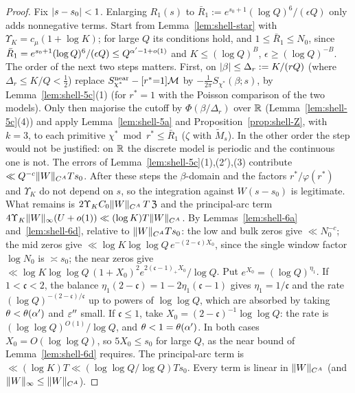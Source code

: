 \begin{proof}
Fix $\lvert s-s_0\rvert<1$. Enlarging $R_1(s)$ to $\bar R_1:=e^{s_0+1}(\log Q)^6/(\epsilon Q)$ only adds nonnegative terms. Start from Lemma~\ref{lem:shell-star} with
$\Upsilon_K=c_\mu(1+\log K)$; for large $Q$ its conditions hold, and $1\le\bar R_1\le N_0$, since $\bar R_1=e^{s_0+1}(\log Q)^6/(\epsilon Q)\le Q^{\alpha'-1+o(1)}$ and $K\le(\log Q)^B$, $\epsilon\ge(\log Q)^{-B}$. The order of the next two steps matters. First, on $\lvert \beta\rvert\le\Delta_r:=K/(rQ)$ (where $\Delta_r\le K/Q<\frac12$) replace
$S^{\rm near}_{\chi^*}-[r^*{=}1]\mathcal M$ by $-\frac1{2\pi}S_{\chi^*}(\beta;s)$, by Lemma~\ref{lem:shell-5c}(1) (for $r^*=1$ with the Poisson comparison of the two
models). Only then majorise the cutoff by $\Phi(\beta/\Delta_r)$ over $\mathbb R$ (Lemma~\ref{lem:shell-5c}(4)) and apply Lemma~\ref{lem:shell-5a} and
Proposition~\ref{prop:shell-Z}, with $k=3$, to each primitive $\chi^*\bmod r^*\le\bar R_1$ ($\zeta$ with $\tilde M_s$). In the other order the step would not be justified: on
$\mathbb R$ the discrete model is periodic and the continuous one is not. The errors of Lemma~\ref{lem:shell-5c}(1),(2$'$),(3) contribute $\ll Q^{-c}\lVert W\rVert_{C^A}Ts_0$.
After these steps the $\beta$-domain and the factors $r^*/\varphi(r^*)$ and $\Upsilon_K$ do not depend on $s$, so the integration against $W(s-s_0)$ is
legitimate. What remains is $2\Upsilon_KC_0\lVert W\rVert_{C^A}\,T\,\mathfrak Z$ and the principal-arc term $4\Upsilon_K\lVert W\rVert_\infty(U+o(1))\ll(\log K)T\lVert W\rVert_{C^A}$.
By Lemmas~\ref{lem:shell-6a} and~\ref{lem:shell-6d}, relative to $\lVert W\rVert_{C^A}Ts_0$:
the low and bulk zeros give $\ll N_0^{-c}$; the mid zeros give $\ll\log K\log\log Q\,e^{-(2-\mathfrak c)X_0}$, since the single window factor $\log N_0$ is
$\asymp s_0$; the near zeros give $\ll\log K\log\log Q\,(1+X_0)^2e^{2(\mathfrak c-1)_+X_0}/\log Q$. Put $e^{X_0}=(\log Q)^{\eta_1}$. If $1<\mathfrak c<2$, the balance
$\eta_1(2-\mathfrak c)=1-2\eta_1(\mathfrak c-1)$ gives $\eta_1=1/\mathfrak c$ and the rate $(\log Q)^{-(2-\mathfrak c)/\mathfrak c}$ up to powers of $\log\log Q$, which are absorbed
by taking $\theta<\theta(\alpha')$ and $\varepsilon''$ small. If $\mathfrak c\le1$, take $X_0=(2-\mathfrak c)^{-1}\log\log Q$: the rate is $(\log\log Q)^{O(1)}/\log Q$, and
$\theta<1=\theta(\alpha')$. In both cases $X_0=O(\log\log Q)$, so $5X_0\le s_0$ for large $Q$, as the near bound of Lemma~\ref{lem:shell-6d} requires. The principal-arc term is $\ll(\log K)T\ll(\log\log Q/\log Q)Ts_0$. Every term is linear in $\lVert W\rVert_{C^A}$ (and
$\lVert W\rVert_\infty\le\lVert W\rVert_{C^A}$).
\end{proof}
